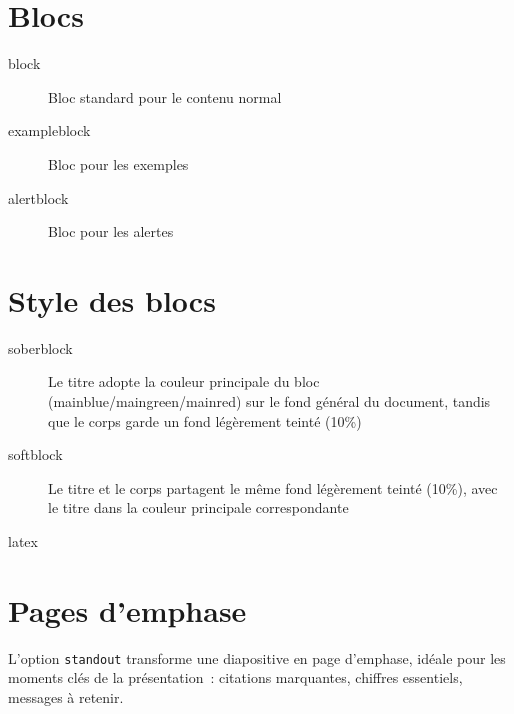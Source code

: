 \documentclass[french]{neoschool}
\begin{document}
\section{Blocs}
\begin{description}
\item[block] Bloc standard pour le contenu normal
\item[exampleblock] Bloc pour les exemples
\item[alertblock] Bloc pour les alertes
\end{description}

\section{Style des blocs}
\begin{description}
\item[soberblock] Le titre adopte la couleur principale du bloc (mainblue/maingreen/mainred) sur le fond général du document, tandis que le corps garde un fond légèrement teinté (10\%)
\item[softblock] Le titre et le corps partagent le même fond légèrement teinté (10\%), avec le titre dans la couleur principale correspondante
\end{description}

\begin{code}{latex}


\end{code}

\section{Pages d'emphase}
L'option \texttt{standout} transforme une diapositive en page d'emphase, idéale pour les moments clés de la présentation~: citations marquantes, chiffres essentiels, messages à retenir.
\end{document}
